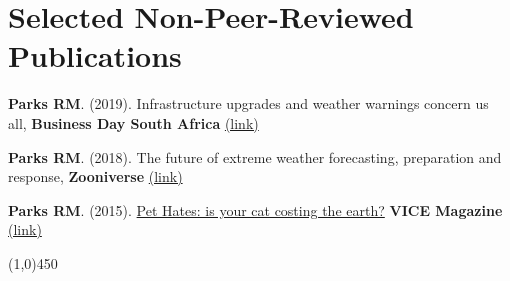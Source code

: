 \section*{Selected Non-Peer-Reviewed Publications}


\noindent \textbf{Parks RM}. (2019). Infrastructure upgrades and weather warnings concern us all, \textbf{Business Day South Africa} \href{https://bit.ly/2pyB4Gc}{(link)} \medskip


\noindent \textbf{Parks RM}. (2018). The future of extreme weather forecasting, preparation and response, \textbf{Zooniverse} \href{https://bit.ly/2zfDlHw}{(link)} \medskip


\noindent \textbf{Parks RM}. (2015). \href{https://bit.ly/2FE08nX}{Pet Hates: is your cat costing the earth?} \textbf{VICE Magazine} \href{https://bit.ly/2FE08nX}{(link)}

\begin{center} \line(1,0){450} \end{center}